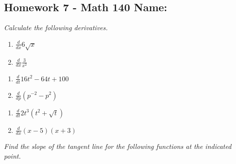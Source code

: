 \documentclass[10pt]{article}
\newcommand{\ds}{\displaystyle}
\begin{document}
\pagestyle{empty}
\subsection*{Homework 7 - Math 140 \hfill Name: \underline{\hspace*{2in}}}

\noindent
\textit{Calculate the following derivatives.  }


\begin{multicols}{2}
\begin{enumerate}
\item $\ds \frac{d}{dx} 6 \sqrt{x}$
\item $\ds \frac{d}{dx} \frac{3}{x^2}$
\setcounter{enumCount}{\theenumi}
\end{enumerate}
\end{multicols}
\vfill

\begin{multicols}{2}
\begin{enumerate}
\setcounter{enumi}{\theenumCount}
\item $\ds \frac{d}{dt} 16t^2 - 64t + 100$
\item $\ds \frac{d}{dp} \left( p^{-2} - p^2 \right)$
\setcounter{enumCount}{\theenumi}
\end{enumerate}
\end{multicols}
\vfill

\begin{multicols}{2}
\begin{enumerate}
\setcounter{enumi}{\theenumCount}
\item $\ds \frac{d}{dt} 2t^3(t^2 + \sqrt{t})$
\item $\ds \frac{d}{dx} (x-5)(x+3)$
\setcounter{enumCount}{\theenumi}
\end{enumerate}
\end{multicols}
\vfill


\noindent
\textit{Find the slope of the tangent line for the following functions at the indicated point.}
\end{document}
